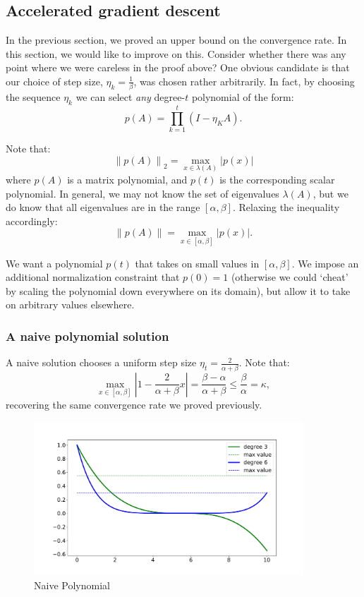 \subsection{Accelerated gradient descent}
In the previous section, we proved an upper bound on the convergence rate. In this section, we would like to improve on this. Consider whether there was any point where we were careless in the proof above? One obvious candidate is that our choice of step size, $\eta_k = \frac{1}{\beta}$, was chosen rather arbitrarily. In fact, by choosing the sequence $\eta_k$ we can select \textit{any} degree-$t$ polynomial of the form:
\[
p(A) = \prod_{k=1}^t \left(I - \eta_K A\right).
\]

Note that:
\begin{equation*}
\left\|p(A)\right\|_2 = \max_{x \in \lambda(A)} \left|p(x)\right|
\end{equation*}
where $p(A)$ is a matrix polynomial, and $p(t)$ is the corresponding scalar polynomial. In general, we may not know the set of eigenvalues $\lambda(A)$, but we do know that all eigenvalues are in the range $[\alpha, \beta]$. Relaxing the inequality accordingly:
\begin{equation*}
\left\|p(A)\right\| = \max_{x \in [\alpha, \beta]} \left|p(x)\right|.
\end{equation*}

We want a polynomial $p(t)$ that takes on small values in $[\alpha, \beta]$. We impose an additional normalization constraint that $p(0) = 1$ (otherwise we could `cheat' by scaling the polynomial down everywhere on its domain), but allow it to take on arbitrary values elsewhere.

\subsubsection{A naive polynomial solution}
A naive solution chooses a uniform step size $\eta_t = \frac{2}{\alpha + \beta}$. Note that:
\[
\max_{x \in [\alpha, \beta]} \left|1 - \frac{2}{\alpha + \beta} x\right| = \frac{\beta - \alpha}{\alpha + \beta} \leq \frac{\beta}{\alpha} = \kappa,
\]
recovering the same convergence rate we proved previously.
\begin{figure}[h]
\includegraphics[width=0.9\textwidth]{figures/lecture6-naive_polynome.pdf}
\centering
\caption{Naive Polynomial}
\label{naive_p}
\end{figure}


